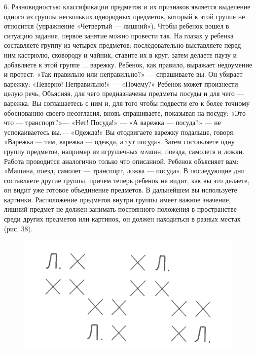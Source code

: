 \documentclass[a5paper]{book}
\begin{document}
6. Разновидностью классификации предметов и их признаков является
выделение одного из группы нескольких однородных предметов, который к
этой группе не относится (упражнение «Четвертый --- лишний»). Чтобы
ребенок вошел в ситуацию задания, первое занятие можно провести так. На
глазах у ребенка составляете группу из четырех предметов:
последовательно выставляете перед ним кастрюлю, сковороду и чайник,
ставите их в круг, затем делаете паузу и добавляете к этой группе ...
варежку. Ребенок, как правило, выражает недоумение и протест. «Так
правильно или неправильно?» --- спрашиваете вы. Он убирает варежку:
«Неверно! Неправильно!» --- «Почему?» Ребенок может произнести целую
речь, Объясняя, для чего предназначены предметы посуды и для чего ---
варежка. Вы соглашаетесь с ним и, для того чтобы подвести его к более
точному обоснованию своего несогласия, вновь спрашиваете, показывая на
посуду: «Это что --- транспорт?»--- «Нет! Посуда!» --- «А варежка ---
посуда?» --- не успокаиваетесь вы.--- «Одежда!» Вы отодвигаете варежку
подальше, говоря: «Варежка --- там, варежка --- одежда, а тут посуда».
Затем составляете одну группу предметов, например из игрушечных
\textsc{ма}шин, поезда, самолета и ложки. Работа проводится аналогично
только что описанной. Ребенок объясняет вам: «Машина, поезд, самолет ---
транспорт, ложка --- посуда». В последующие дни составляете другие
группы, причем теперь ребенок не видит, как вы это делаете, он видит уже
готовое объединение предметов. В дальнейшем вы используете картинки.
Расположение предметов внутри группы имеет важное значение, лишний
предмет не должен занимать постоянного положения в пространстве среди
других предметов или картинок, он должен находиться в разных местах
(рис. 38).

\begin{figure}
\centering
\includegraphics[width=\linewidth]{media/media/image35.png}
\end{figure}
\end{document}
